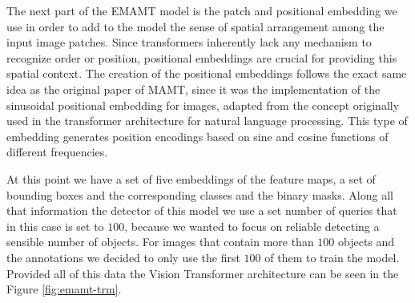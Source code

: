 The next part of the EMAMT model is the patch and positional embedding we use in order to add to the model the  sense of spatial arrangement among the input 
image patches. Since transformers inherently lack any mechanism to recognize order or position, positional embeddings are crucial for providing this spatial 
context. The creation of the positional embeddings follows the exact same idea as the original paper of MAMT, since it was the implementation of the
sinusoidal positional embedding for images, adapted from the concept originally used in the transformer architecture for natural language processing.
This type of embedding generates position encodings based on sine and cosine functions of different frequencies.


At this point we have a set of five embeddings of the feature maps, a set of bounding boxes and the corresponding classes and the binary masks. Along all
that information the detector of this model we use a set number of queries that in this case is set to $100$, because we wanted to focus on reliable 
detecting a sensible number of objects. For images that contain more than $100$ objects and the annotations we decided to only use the first $100$ of them 
to train the model. Provided all of this data the Vision Transformer architecture can be seen in the Figure \ref{fig:emamt-trm}.

